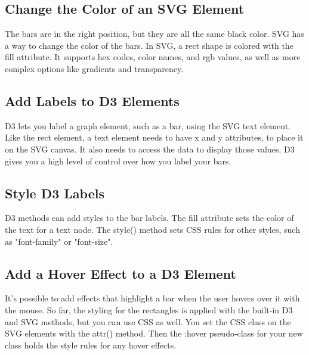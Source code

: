 \documentclass{article}%
\begin{document}
%
\subsection{Change the Color of an SVG Element}%
\label{subsec:ChangetheColorofanSVGElement}%
The bars are in the right position, but they are all the same black color. SVG has a way to change the color of the bars.\newline%
In SVG, a rect shape is colored with the fill attribute. It supports hex codes, color names, and rgb values, as well as more complex options like gradients and transparency.\newline%

%
\subsection{Add Labels to D3 Elements}%
\label{subsec:AddLabelstoD3Elements}%
D3 lets you label a graph element, such as a bar, using the SVG text element.\newline%
Like the rect element, a text element needs to have x and y attributes, to place it on the SVG canvas. It also needs to access the data to display those values.\newline%
D3 gives you a high level of control over how you label your bars.\newline%

%
\subsection{Style D3 Labels}%
\label{subsec:StyleD3Labels}%
D3 methods can add styles to the bar labels. The fill attribute sets the color of the text for a text node. The style() method sets CSS rules for other styles, such as "font{-}family" or "font{-}size".\newline%

%
\subsection{Add a Hover Effect to a D3 Element}%
\label{subsec:AddaHoverEffecttoaD3Element}%
It's possible to add effects that highlight a bar when the user hovers over it with the mouse. So far, the styling for the rectangles is applied with the built{-}in D3 and SVG methods, but you can use CSS as well.\newline%
You set the CSS class on the SVG elements with the attr() method. Then the :hover pseudo{-}class for your new class holds the style rules for any hover effects.\newline%
\end{document}
